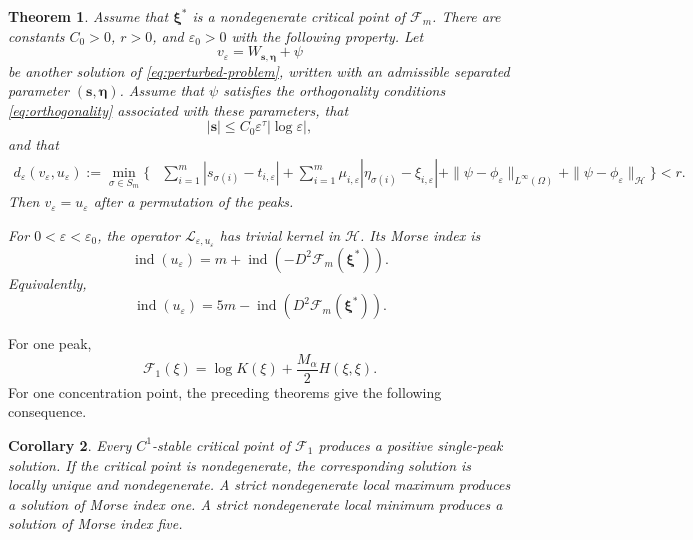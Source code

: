 \documentclass[11pt]{article}
\newtheorem{theorem}{Theorem}[section]
\newtheorem{corollary}[theorem]{Corollary}
\numberwithin{equation}{section}
\begin{document}
\begin{theorem}\label{thm:qualitative}
Assume that $\boldsymbol\xi^{*}$ is a nondegenerate critical point
of $\mathcal F_m$. There are constants $C_0>0$, $r>0$, and
$\varepsilon_0>0$ with the following property. Let
\[
v_\varepsilon
=W_{\boldsymbol s,\boldsymbol\eta}+\psi
\]
be another solution of \eqref{eq:perturbed-problem}, written with an
admissible separated parameter $(\boldsymbol s,\boldsymbol\eta)$.
Assume that $\psi$ satisfies the orthogonality conditions
\eqref{eq:orthogonality} associated with these parameters, that
\begin{equation}\label{eq:uniqueness-scale-class}
|\boldsymbol s|
\leq C_0\varepsilon^\tau|\log\varepsilon|,
\end{equation}
and that
\begin{equation}\label{eq:branch-distance}
\begin{aligned}
d_\varepsilon(v_\varepsilon,u_\varepsilon)
:=\min_{\sigma\in S_m}\Bigg\{
&\sum_{i=1}^{m}|s_{\sigma(i)}-t_{i,\varepsilon}|+\sum_{i=1}^{m}\mu_{i,\varepsilon}
|\eta_{\sigma(i)}-\xi_{i,\varepsilon}| +\|\psi-\phi_\varepsilon\|_{L^\infty(\Omega)}
+\|\psi-\phi_\varepsilon\|_{\mathcal H}
\Bigg\}<r.
\end{aligned}
\end{equation}
Then $v_\varepsilon=u_\varepsilon$ after a permutation of the
peaks.

For $0<\varepsilon<\varepsilon_0$, the operator
$\mathscr L_{\varepsilon,u_\varepsilon}$ has trivial kernel in
$\mathcal H$. Its Morse index is
\begin{equation}\label{eq:Morse-formula-intro}
\operatorname{ind}(u_\varepsilon)
=m+\operatorname{ind}
\left(-D^2\mathcal F_m(\boldsymbol\xi^{*})\right).
\end{equation}
Equivalently,
\begin{equation}\label{eq:Morse-equivalent}
\operatorname{ind}(u_\varepsilon)
=5m-\operatorname{ind}
\left(D^2\mathcal F_m(\boldsymbol\xi^{*})\right).
\end{equation}
\end{theorem}

For one peak,
\begin{equation*}
\mathcal F_{1}(\xi)
=\log K(\xi)+\frac{M_{\alpha}}{2}H(\xi,\xi).
\end{equation*}
For one concentration point, the preceding theorems give the following consequence.

\begin{corollary}\label{cor:single-peak}
Every $C^1$-stable critical point of $\mathcal F_{1}$ produces a positive
single-peak solution. If the critical point is nondegenerate, the
corresponding solution is locally unique and nondegenerate. A strict nondegenerate
local maximum produces a solution of Morse index one. A strict
nondegenerate local minimum produces a solution of Morse index five.
\end{corollary}
\end{document}
